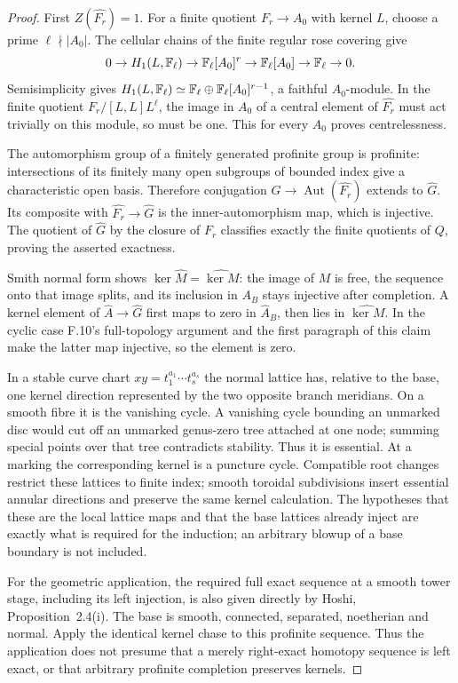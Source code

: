 \begin{proof}
First $Z(\widehat{F_r})=1$. For a finite quotient $F_r\to A_0$
with kernel $L$, choose a prime $\ell\nmid|A_0|$. The cellular
chains of the finite regular rose covering give
\[
0\to H_1(L,\mathbb F_\ell)\to\mathbb F_\ell[A_0]^r
\to\mathbb F_\ell[A_0]\to\mathbb F_\ell\to0.
\]
Semisimplicity gives
$H_1(L,\mathbb F_\ell)\simeq\mathbb F_\ell\oplus
\mathbb F_\ell[A_0]^{r-1}$, a faithful $A_0$-module. In the finite
quotient $F_r/[L,L]L^\ell$, the image in $A_0$ of a central
element of $\widehat{F_r}$ must act trivially on this module, so
must be one. This for every $A_0$ proves centrelessness.

The automorphism group of a finitely generated profinite group is
profinite: intersections of its finitely many open subgroups of
bounded index give a characteristic open basis. Therefore conjugation
$G\to\operatorname{Aut}(\widehat{F_r})$ extends to
$\widehat G$. Its composite with
$\widehat{F_r}\to\widehat G$ is the inner-automorphism map,
which is injective. The quotient of $\widehat G$ by the closure
of $F_r$ classifies exactly the finite quotients of $Q$, proving
the asserted exactness.

Smith normal form shows
$\ker\widehat M=\widehat{\ker M}$: the image of $M$ is free,
the sequence onto that image splits, and its inclusion in $A_B$
stays injective after completion. A kernel element of
$\widehat A\to\widehat G$ first maps to zero in
$\widehat A_B$, then lies in $\widehat{\ker M}$. In the cyclic
case F.10's full-topology argument and the first paragraph of this
claim make the latter map injective, so the element is zero.

In a stable curve chart $xy=t_1^{a_1}\cdots t_s^{a_s}$ the normal
lattice has, relative to the base, one kernel direction represented
by the two opposite branch meridians. On a smooth fibre it is the
vanishing cycle. A vanishing cycle bounding an unmarked disc would
cut off an unmarked genus-zero tree attached at one node; summing
special points over that tree contradicts stability. Thus it is
essential. At a marking the corresponding kernel is a puncture
cycle. Compatible root changes restrict these lattices to finite
index; smooth toroidal subdivisions insert essential annular
directions and preserve the same kernel calculation. The hypotheses
that these are the local lattice maps and that the base lattices
already inject are exactly what is required for the induction;
an arbitrary blowup of a base boundary is not included.

For the geometric application, the required full exact sequence
at a smooth tower stage, including its left injection, is also
given directly by Hoshi, Proposition~2.4(i). The base is smooth,
connected, separated, noetherian and normal. Apply the identical
kernel chase to this profinite sequence. Thus the application does
not presume that a merely right-exact homotopy sequence is left
exact, or that arbitrary profinite completion preserves kernels.


\end{proof}
